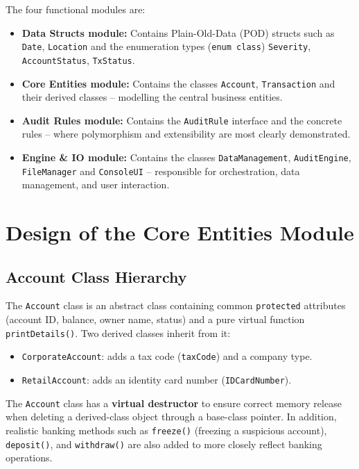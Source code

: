     The four functional modules are:
    \begin{itemize}
        \item \textbf{Data Structs module:} Contains Plain-Old-Data (POD) structs such as \texttt{Date}, \texttt{Location} and the enumeration types (\texttt{enum class}) \texttt{Severity}, \texttt{AccountStatus}, \texttt{TxStatus}.
        \item \textbf{Core Entities module:} Contains the classes \texttt{Account}, \texttt{Transaction} and their derived classes -- modelling the central business entities.
        \item \textbf{Audit Rules module:} Contains the \texttt{AuditRule} interface and the concrete rules -- where polymorphism and extensibility are most clearly demonstrated.
        \item \textbf{Engine \& IO module:} Contains the classes \texttt{DataManagement}, \texttt{AuditEngine}, \texttt{FileManager} and \texttt{ConsoleUI} -- responsible for orchestration, data management, and user interaction.
    \end{itemize}

\section{Design of the Core Entities Module}
    \subsection{Account Class Hierarchy}
    The \texttt{Account} class is an abstract class containing common \texttt{protected} attributes (account ID, balance, owner name, status) and a pure virtual function \texttt{printDetails()}. Two derived classes inherit from it:
    \begin{itemize}
        \item \texttt{CorporateAccount}: adds a tax code (\texttt{taxCode}) and a company type.
        \item \texttt{RetailAccount}: adds an identity card number (\texttt{IDCardNumber}).
    \end{itemize}
    The \texttt{Account} class has a \textbf{virtual destructor} to ensure correct memory release when deleting a derived-class object through a base-class pointer. In addition, realistic banking methods such as \texttt{freeze()} (freezing a suspicious account), \texttt{deposit()}, and \texttt{withdraw()} are also added to more closely reflect banking operations.

